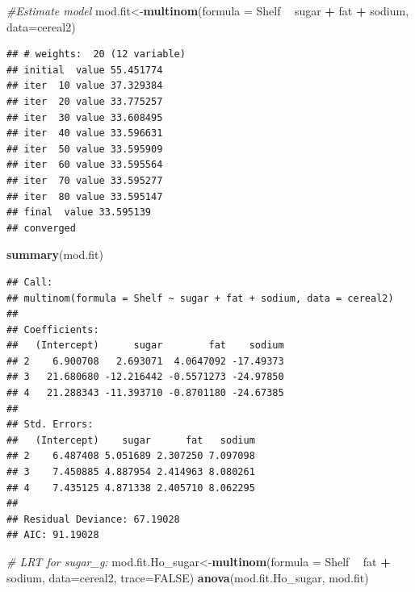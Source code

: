 \documentclass[11pt,]{article}
\newenvironment{Shaded}{\begin{snugshade}}{\end{snugshade}}
\newcommand{\KeywordTok}[1]{\textcolor[rgb]{0.13,0.29,0.53}{\textbf{#1}}}
\newcommand{\DataTypeTok}[1]{\textcolor[rgb]{0.13,0.29,0.53}{#1}}
\newcommand{\StringTok}[1]{\textcolor[rgb]{0.31,0.60,0.02}{#1}}
\newcommand{\CommentTok}[1]{\textcolor[rgb]{0.56,0.35,0.01}{\textit{#1}}}
\newcommand{\OtherTok}[1]{\textcolor[rgb]{0.56,0.35,0.01}{#1}}
\newcommand{\OperatorTok}[1]{\textcolor[rgb]{0.81,0.36,0.00}{\textbf{#1}}}
\newcommand{\NormalTok}[1]{#1}
\begin{document}
\begin{Shaded}
\begin{Highlighting}[]
\CommentTok{#Estimate model}
\NormalTok{mod.fit<-}\KeywordTok{multinom}\NormalTok{(}\DataTypeTok{formula =}\NormalTok{ Shelf }\OperatorTok{~}\StringTok{ }\NormalTok{sugar }\OperatorTok{+}\StringTok{ }\NormalTok{fat }\OperatorTok{+}\StringTok{ }\NormalTok{sodium, }\DataTypeTok{data=}\NormalTok{cereal2)}
\end{Highlighting}
\end{Shaded}

\begin{verbatim}
## # weights:  20 (12 variable)
## initial  value 55.451774 
## iter  10 value 37.329384
## iter  20 value 33.775257
## iter  30 value 33.608495
## iter  40 value 33.596631
## iter  50 value 33.595909
## iter  60 value 33.595564
## iter  70 value 33.595277
## iter  80 value 33.595147
## final  value 33.595139 
## converged
\end{verbatim}

\begin{Shaded}
\begin{Highlighting}[]
\KeywordTok{summary}\NormalTok{(mod.fit)}
\end{Highlighting}
\end{Shaded}

\begin{verbatim}
## Call:
## multinom(formula = Shelf ~ sugar + fat + sodium, data = cereal2)
## 
## Coefficients:
##   (Intercept)      sugar        fat    sodium
## 2    6.900708   2.693071  4.0647092 -17.49373
## 3   21.680680 -12.216442 -0.5571273 -24.97850
## 4   21.288343 -11.393710 -0.8701180 -24.67385
## 
## Std. Errors:
##   (Intercept)    sugar      fat   sodium
## 2    6.487408 5.051689 2.307250 7.097098
## 3    7.450885 4.887954 2.414963 8.080261
## 4    7.435125 4.871338 2.405710 8.062295
## 
## Residual Deviance: 67.19028 
## AIC: 91.19028
\end{verbatim}

\begin{Shaded}
\begin{Highlighting}[]
\CommentTok{# LRT for sugar_g:}
\NormalTok{mod.fit.Ho_sugar<-}\KeywordTok{multinom}\NormalTok{(}\DataTypeTok{formula =}\NormalTok{ Shelf }\OperatorTok{~}\StringTok{ }\NormalTok{fat }\OperatorTok{+}\StringTok{ }\NormalTok{sodium, }\DataTypeTok{data=}\NormalTok{cereal2, }\DataTypeTok{trace=}\OtherTok{FALSE}\NormalTok{)}
\KeywordTok{anova}\NormalTok{(mod.fit.Ho_sugar, mod.fit)  }
\end{Highlighting}
\end{Shaded}
\end{document}
